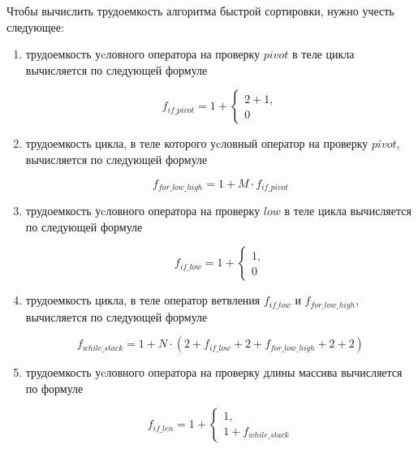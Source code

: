 Чтобы вычислить трудоемкость алгоритма быстрой сортировки, нужно учесть следующее:

\begin{enumerate}[label=---]
		
	\item трудоемкость уcловного оператора на проверку $pivot$ в теле цикла вычисляется по следующей формуле
	
	\begin{equation}
	\label{eq:2.1}
	f_{if\_pivot} = 1 + 
	\begin{cases}
	2 + 1, \\
	0
	\end{cases}
	\end{equation}		

	\item трудоемкость цикла, в теле которого уcловный оператор на проверку $pivot$, вычисляется по следующей формуле

	\begin{equation}
	\label{eq:2.2}
	f_{for\_low\_high} = 1 + M \cdot f_{if\_pivot}
	\end{equation}

	\item трудоемкость уcловного оператора на проверку $low$ в теле цикла вычисляется по следующей формуле

	\begin{equation}
	\label{eq:2.2}
	f_{if\_low
	} = 1 + 
	\begin{cases}
	1, \\
	0
	\end{cases}
	\end{equation}		

	\item трудоемкость цикла, в теле оператор ветвления $f_{if\_low}$ и $f_{for\_low\_high}$, вычисляется по следующей формуле

	\begin{equation}
	\label{eq:2.3}
	f_{while\_stack} = 1 + N \cdot (2 + f_{if\_low} + 2 + f_{for\_low\_high}
	+ 2 + 2)
	\end{equation}
	
	\item трудоемкость уcловного оператора на проверку длины массива вычисляется по формуле
	
	\begin{equation}
	\label{eq:2.4}
	f_{if\_len} = 1 + 
	\begin{cases}
	1, \\
	1 + f_{while\_stack}
	\end{cases}
	\end{equation}	
		
\end{enumerate}
		
